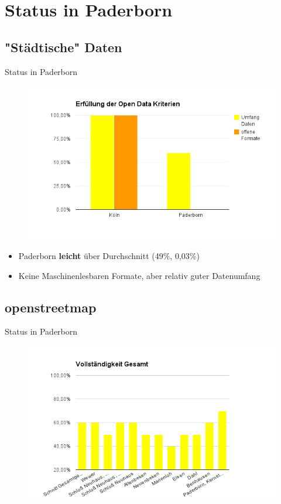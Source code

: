 \section{Status in Paderborn}

\subsection{"Städtische" Daten}
\begin{frame}[t]{Status in Paderborn}
 \begin{figure}
  \centering
  \includegraphics[scale=0.45]{section_paderborn_status.png}
 \end{figure}
 \begin{itemize}
  \item Paderborn \textbf{leicht} über Durchschnitt (49\%, 0,03\%)
  \item Keine Maschinenlesbaren Formate, aber relativ guter Datenumfang
 \end{itemize}
\end{frame}

\subsection{openstreetmap}
\begin{frame}[t]{Status in Paderborn}
 \begin{figure}
  \centering
  \includegraphics[scale=0.5]{section_paderborn_osm_overall.png}
 \end{figure}
\end{frame}

